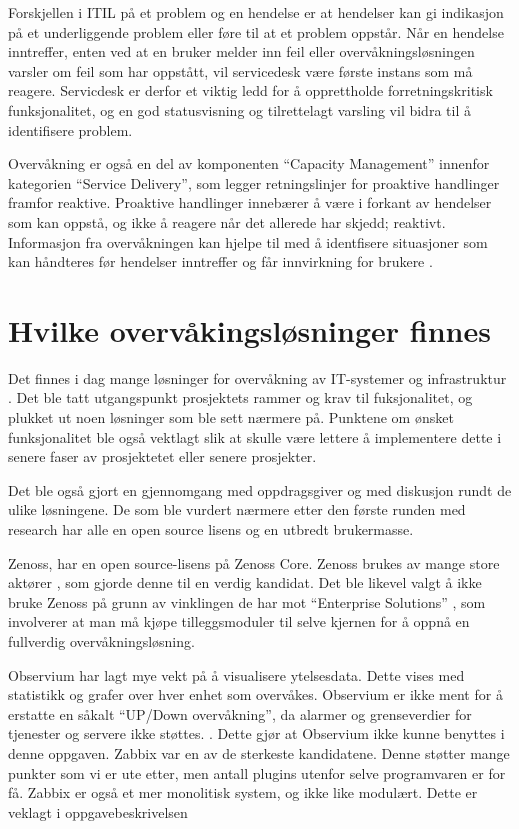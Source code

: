 Forskjellen i ITIL på et problem og en hendelse er at hendelser kan gi indikasjon på et underliggende problem eller føre til at et problem oppstår. Når en hendelse inntreffer, enten ved at en bruker melder inn feil eller overvåkningsløsningen varsler om feil som har oppstått, vil servicedesk være første instans som må reagere. Servicdesk er derfor et viktig ledd for å opprettholde forretningskritisk funksjonalitet, og en god statusvisning og tilrettelagt varsling vil bidra til å identifisere problem.

Overvåkning er også en del av komponenten “Capacity Management” innenfor kategorien “Service Delivery”, som legger retningslinjer for proaktive handlinger framfor reaktive. Proaktive handlinger innebærer å være i forkant av hendelser som kan oppstå, og ikke å reagere når det allerede har skjedd; reaktivt. Informasjon fra overvåkningen kan hjelpe til med å identfisere situasjoner som kan håndteres før hendelser inntreffer og får innvirkning for brukere \cite{itil1} \cite{itil2} \cite{events}.

\section{Hvilke overvåkingsløsninger finnes}
Det finnes i dag mange løsninger for overvåkning av IT-systemer og infrastruktur \cite{wiki:networkmonitoring}. Det ble tatt utgangspunkt prosjektets rammer og krav til fuksjonalitet, og plukket ut noen løsninger som ble sett nærmere på. Punktene om ønsket funksjonalitet ble også vektlagt slik at skulle være lettere å implementere dette i senere faser av prosjektetet eller senere prosjekter. 

Det ble også gjort en gjennomgang med oppdragsgiver og med diskusjon rundt de ulike løsningene. De som ble vurdert nærmere etter den første runden med research har alle en open source lisens og en utbredt brukermasse. 

Zenoss, har en open source-lisens på Zenoss Core. Zenoss brukes av mange store aktører \cite{zenoss}, som gjorde denne til en verdig kandidat. Det ble likevel valgt å ikke bruke Zenoss på grunn av vinklingen de har mot “Enterprise Solutions” \cite{zenpacks}, som involverer at man må kjøpe tilleggsmoduler til selve kjernen for å oppnå en fullverdig overvåkningsløsning.

Observium har lagt mye vekt på å visualisere ytelsesdata. Dette vises med statistikk og grafer over hver enhet som overvåkes. Observium er ikke ment for å erstatte en såkalt “UP/Down overvåkning”, da alarmer og grenseverdier for tjenester og servere ikke støttes. \cite{observium}. Dette gjør at Observium ikke kunne benyttes i denne oppgaven.
Zabbix \cite{zabbix} var en av de sterkeste kandidatene. Denne støtter mange punkter som vi er ute etter, men antall plugins utenfor selve programvaren er for få. Zabbix er også et mer monolitisk system, og ikke like modulært. Dette er veklagt i oppgavebeskrivelsen \cite{zabbixandnagios}

